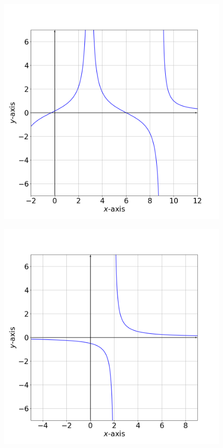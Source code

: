 \documentclass[11pt]{book}
\begin{document}
\begin{center}
    \begin{minipage}{0.465\textwidth}
        \begin{center}
            \includegraphics[width=0.85\textwidth]{critical.png}
        \end{center}
    \end{minipage}
    \begin{minipage}{0.465\textwidth}
        \begin{center}
            \includegraphics[width=0.85\textwidth]{limit_reciprocal.png}
        \end{center}
    \end{minipage}
\end{center}
\end{document}
